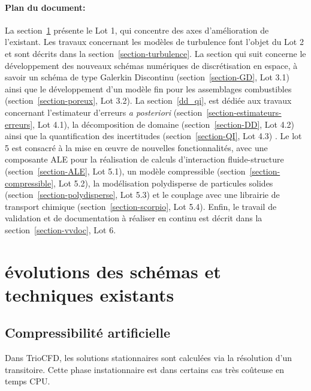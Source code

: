 \newline

\paragraph{Plan du document:} La section~\ref{section-VEF-am\'eliorations} pr\'esente le Lot 1, qui concentre des axes d'am\'elioration de l'existant.
Les travaux concernant les mod\`eles de turbulence font l'objet du Lot 2 et sont d\'ecrits dans la section~\ref{section-turbulence}.
La section qui suit concerne le d\'eveloppement des nouveaux sch\'emas num\'eriques de discr\'etisation en espace, \`a savoir un sch\'ema de type Galerkin Discontinu (section~\ref{section-GD}, Lot 3.1) ainsi que le d\'eveloppement d'un mod\`ele fin pour les assemblages combustibles (section~\ref{section-poreux}, Lot 3.2).
La section~\ref{dd_qi}, est d\'edi\'ee aux travaux concernant l'estimateur d'erreurs {\it{a posteriori}} (section~\ref{section-estimateurs-erreurs}, Lot 4.1),  la d\'ecomposition de domaine (section~\ref{section-DD}, Lot 4.2) ainsi que la quantification des incertitudes (section~\ref{section-QI}, Lot 4.3) . 
Le lot 5 est consacr\'e \`a la mise en {\oe}uvre de nouvelles fonctionnalit\'es, avec une composante ALE pour la r\'ealisation de calculs d'interaction fluide-structure (section~\ref{section-ALE}, Lot 5.1), un mod\`ele compressible (section~\ref{section-compressible}, Lot 5.2), la mod\'elisation polydisperse de particules solides (section~\ref{section-polydisperse}, Lot 5.3) et le couplage avec une librairie de transport chimique (section~\ref{section-scorpio}, Lot 5.4). Enfin, le travail de validation et de documentation \`a r\'ealiser en continu est d\'ecrit dans la section~\ref{section-vvdoc}, Lot 6.



\section{\'evolutions des sch\'emas et techniques existants }
\label{section-VEF-am\'eliorations}
\subsection{Compressibilit\'e artificielle}
\label{Algo-Stat}
Dans TrioCFD, les solutions stationnaires sont calcul\'ees via la r\'esolution d'un transitoire. Cette phase instationnaire est dans certains cas tr\`es co\^uteuse en temps CPU. 

